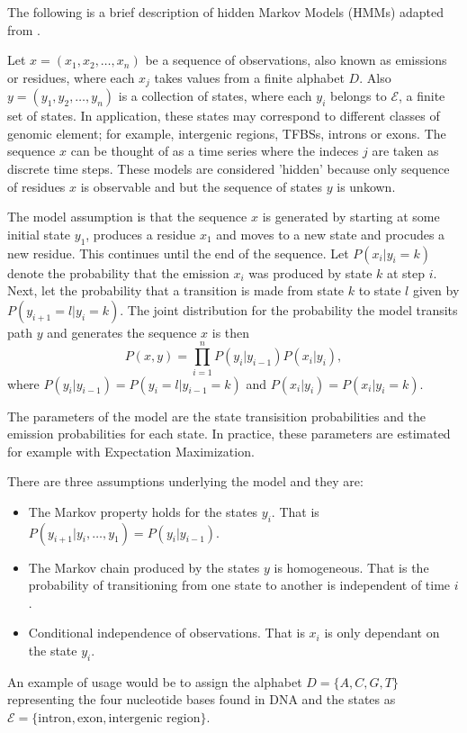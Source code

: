 The following is a brief description of hidden Markov Models (HMMs) adapted from \cite{mesa2016hidden}.

Let $x = (x_1,x_2,\ldots,x_n)$ be a sequence of observations, also known as emissions or residues, where each $x_j$ takes values from a finite alphabet $D$. 
Also $y = (y_1,y_2,\ldots,y_n)$ is a collection of states, where each $y_i$ belongs to $\mathcal{E}$, a finite set of states. In application, these states may correspond to different classes of genomic element; for example, intergenic regions, TFBSs, introns or exons. The sequence $x$ can be thought of as a time series where the indeces $j$ are taken as discrete time steps. These models are considered 'hidden' because only sequence of residues $x$ is observable and but the sequence of states $y$ is unkown.
 
The model assumption is that the sequence $x$ is generated by starting at some initial state $y_1$, produces a residue $x_1$ and moves to a new state and procudes a new residue. This continues until the end of the sequence. Let $P(x_i|y_i = k)$ denote the probability that the emission $x_i$ was produced by state $k$ at step $i$. Next, let the probability that a transition is made from state $k$ to state $l$ given by $P(y_{i+1} = l | y_i = k)$. The joint distribution for the probability the model transits path $y$ and generates the sequence $x$ is then
	\begin{equation}
		P(x,y) = \prod_{i=1}^{n} P(y_i|y_{i-1})P(x_i|y_i),
	\end{equation}
where $P(y_i|y_{i-1}) = P(y_{i} = l | y_{i-1} = k)$ and $P(x_i|y_i) = P(x_i|y_i = k)$. 

The parameters of the model are the state transisition probabilities and the emission probabilities for each state. In practice, these parameters are estimated for example with Expectation Maximization.

There are three assumptions underlying the model and they are:
	\begin{itemize}
		\item The Markov property holds for the states $y_i$. That is $P(y_{i+1}|y_i,\ldots,y_1) = P(y_i|y_{i-1})$.
		\item The Markov chain produced by the states $y$ is homogeneous. That is the probability of transitioning from one state to another is independent of time $i$. 
		\item Conditional independence of observations. That is $x_i$ is only dependant on the state $y_i$. 
	\end{itemize}

An example of usage would be to assign the alphabet $D = \{A,C,G,T\}$ representing the four nucleotide bases found in DNA and the states as $\mathcal{E} = \{\text{intron}, \text{exon}, \text{intergenic region}\}$. 






